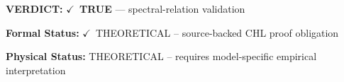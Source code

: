 \textbf{VERDICT:} \ensuremath{\checkmark}\ \textbf{TRUE} --- spectral-relation validation

\textbf{Formal Status:} \ensuremath{\checkmark}\ THEORETICAL -- source-backed CHL proof obligation

\textbf{Physical Status:} THEORETICAL -- requires model-specific empirical interpretation
\par\vspace{0.45em}
\par
\ifTZPDarkEdition
{}
\fi
\endgroup
\endgroup
